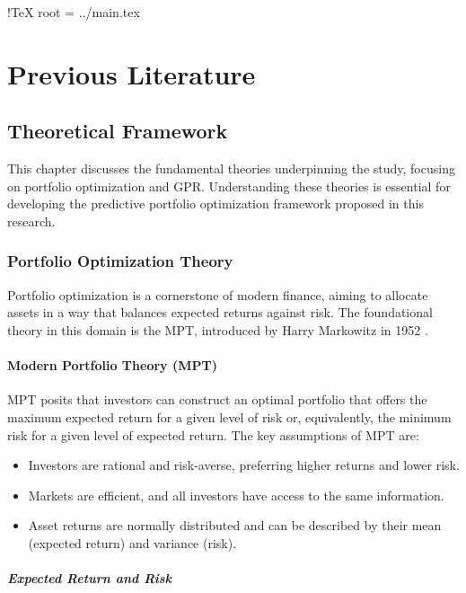!TeX root = ../main.tex

\chapter{Previous Literature}\label{chapter:previous literature}

\section{Theoretical Framework}

This chapter discusses the fundamental theories underpinning the study, focusing on portfolio optimization and \ac{GPR}. Understanding these theories is essential for developing the predictive portfolio optimization framework proposed in this research.

\subsection{Portfolio Optimization Theory}

Portfolio optimization is a cornerstone of modern finance, aiming to allocate assets in a way that balances expected returns against risk. The foundational theory in this domain is the \ac{MPT}, introduced by Harry Markowitz in 1952 \cite{markowitz1952portfolio}.

\subsubsection{Modern Portfolio Theory (MPT)}

\ac{MPT} posits that investors can construct an optimal portfolio that offers the maximum expected return for a given level of risk or, equivalently, the minimum risk for a given level of expected return. The key assumptions of MPT are:

\begin{itemize}
    \item Investors are rational and risk-averse, preferring higher returns and lower risk.
    \item Markets are efficient, and all investors have access to the same information.
    \item Asset returns are normally distributed and can be described by their mean (expected return) and variance (risk).
\end{itemize}

\paragraph{Expected Return and Risk}

